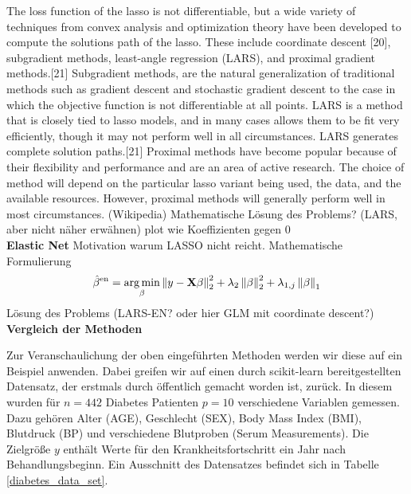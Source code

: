 The loss function of the lasso is not differentiable, but a wide variety of techniques from convex analysis and optimization theory have been developed to compute the solutions path of the lasso. These include coordinate descent [20], subgradient methods, least-angle regression (LARS), and proximal gradient methods.[21] Subgradient methods, are the natural generalization of traditional methods such as gradient descent and stochastic gradient descent to the case in which the objective function is not differentiable at all points. LARS is a method that is closely tied to lasso models, and in many cases allows them to be fit very efficiently, though it may not perform well in all circumstances. LARS generates complete solution paths.[21] Proximal methods have become popular because of their flexibility and performance and are an area of active research. The choice of method will depend on the particular lasso variant being used, the data, and the available resources. However, proximal methods will generally perform well in most circumstances. (Wikipedia)
Mathematische Lösung des Problems? (LARS, aber nicht näher erwähnen)
plot wie Koeffizienten gegen 0\\

\textbf{Elastic Net}
Motivation warum LASSO nicht reicht. 
Mathematische Formulierung
\begin{align}
\label{elastic_net}
\hat{\beta}^{\text{en}} = \operatorname*{arg\,min}_{\beta} \left\lVert y - \mathbf{X} \beta \right\rVert_2^2 + \lambda_2 \left\lVert \beta \right\rVert_{2}^{2} + \lambda_{1,j} \left\lVert \beta \right\rVert_{1}
\end{align}
Lösung des Problems (LARS-EN? oder hier GLM mit coordinate descent?)\\

\textbf{Vergleich der Methoden}

Zur Veranschaulichung der oben eingeführten Methoden werden wir diese auf ein Beispiel anwenden. Dabei greifen wir auf einen durch scikit-learn \cite{scikit_learn} bereitgestellten Datensatz, der erstmals durch \cite{efron_lars} öffentlich gemacht worden ist, zurück. In diesem wurden für $n = 442$ Diabetes Patienten $p=10$ verschiedene Variablen gemessen. Dazu gehören Alter (AGE), Geschlecht (SEX), Body Mass Index (BMI), Blutdruck (BP) und verschiedene Blutproben (Serum Measurements). Die Zielgröße $y$ enthält Werte für den Krankheitsfortschritt ein Jahr nach Behandlungsbeginn. Ein Ausschnitt des Datensatzes befindet sich in Tabelle \ref{diabetes_data_set}.

